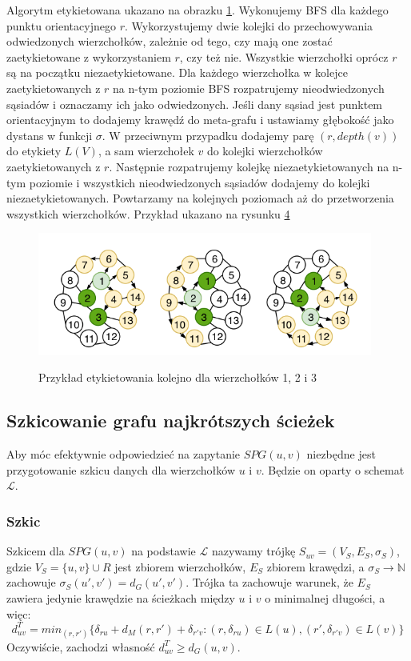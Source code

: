 \documentclass{article}
\theoremstyle{definition}
\begin{document}
            Algorytm etykietowana ukazano na obrazku \hyperref[fig:alg2]{1}. Wykonujemy BFS dla każdego punktu orientacyjnego $r$. Wykorzystujemy dwie kolejki do przechowywania odwiedzonych wierzchołków, zależnie od tego, czy mają one zostać zaetykietowane z wykorzystaniem $r$, czy też nie. Wszystkie wierzchołki oprócz $r$ są na początku niezaetykietowane. Dla każdego wierzchołka w kolejce zaetykietowanych z $r$ na n-tym poziomie BFS rozpatrujemy nieodwiedzonych sąsiadów i oznaczamy ich jako odwiedzonych. Jeśli dany sąsiad jest punktem orientacyjnym to dodajemy krawędź do meta-grafu i ustawiamy głębokość jako dystans w funkcji $\sigma$. W przeciwnym przypadku dodajemy parę $(r, depth(v))$ do etykiety $L(V)$, a sam wierzchołek $v$ do kolejki wierzchołków zaetykietowanych z $r$. Następnie rozpatrujemy kolejkę niezaetykietowanych na n-tym poziomie i wszystkich nieodwiedzonych sąsiadów dodajemy do kolejki niezaetykietowanych. Powtarzamy na kolejnych poziomach aż do przetworzenia wszystkich wierzchołków. Przykład ukazano na rysunku \hyperref[fig:label]{4}

            \begin{figure}[!tbh]
                \includegraphics[width=11cm]{img/labelling.png}
                \centering
                \label{fig:label}
                \caption{Przykład etykietowania kolejno dla wierzchołków 1, 2 i 3}
            \end{figure}

    \subsection{Szkicowanie grafu najkrótszych ścieżek}
        Aby móc efektywnie odpowiedzieć na zapytanie $SPG(u,v)$ niezbędne jest przygotowanie szkicu danych dla wierzchołków $u$ i $v$. Będzie on oparty o schemat $\mathcal{L}$.
        
        \subsubsection*{Szkic}
            Szkicem dla $SPG(u,v)$ na podstawie $\mathcal{L}$ nazywamy trójkę $S_{uv} = (V_S, E_S, \sigma_S)$, gdzie $V_S = \{u,v\} \cup R$ jest zbiorem wierzchołków, $E_S$ zbiorem krawędzi, a $\sigma_S \rightarrow \mathbb{N}$ zachowuje $\sigma_S(u', v') = d_G(u', v')$. Trójka ta zachowuje warunek, że $E_S$ zawiera jedynie krawędzie na ścieżkach między $u$ i $v$ o minimalnej długości, a więc:
            \[
                d_{uv}^T = min_{(r,r')}\{\delta_{ru} + d_M(r,r') + \delta_{r'v} : (r,\delta_{ru}) \in L(u), (r',\delta_{r'v}) \in L(v)\}
            \]
            Oczywiście, zachodzi własność $d_{uv}^T \geq d_G(u,v)$. 
            
\end{document}
